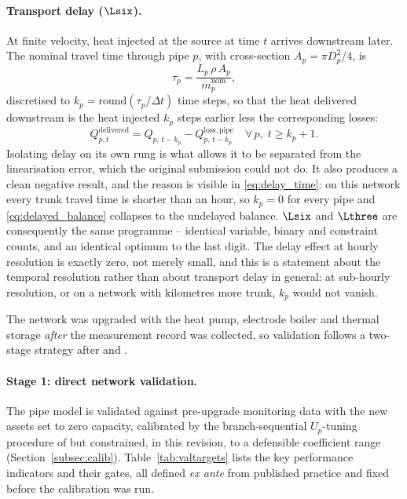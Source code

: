 \paragraph{Transport delay ($\Lsix$).}
At finite velocity, heat injected at the source at time $t$ arrives downstream later. The
nominal travel time through pipe $p$, with cross-section $A_p = \pi D_p^2/4$, is
%
\begin{equation}
  \tau_p = \frac{L_p\, \rho\, A_p}{\dot{m}_p^{\mathrm{nom}}},
  \label{eq:delay_time}
\end{equation}
%
discretised to $k_p = \mathrm{round}(\tau_p/\Delta t)$ time steps, so that the heat
delivered downstream is the heat injected $k_p$ steps earlier less the corresponding
losses:
%
\begin{equation}
  Q_{p,t}^{\mathrm{delivered}} =
    Q_{p,\,t-k_p} - Q_{p,\,t-k_p}^{\mathrm{loss,pipe}}
  \quad \forall\, p,\; t \geq k_p{+}1.
  \label{eq:delayed_balance}
\end{equation}
%
Isolating delay on its own rung is what allows it to be separated from the linearisation
error, which the original submission could not do. It also produces a clean negative
result, and the reason is visible in \eqref{eq:delay_time}: on this network every trunk
travel time is shorter than an hour, so $k_p = 0$ for every pipe and
\eqref{eq:delayed_balance} collapses to the undelayed balance. $\Lsix$ and $\Lthree$ are
consequently the same programme -- identical variable, binary and constraint counts, and
an identical optimum to the last digit. The delay effect at hourly resolution is exactly
zero, not merely small, and this is a statement about the temporal resolution rather than
about transport delay in general: at sub-hourly resolution, or on a network with
kilometres more trunk, $k_p$ would not vanish.


The network was upgraded with the heat pump, electrode boiler and thermal storage
\emph{after} the measurement record was collected, so validation follows a two-stage
strategy after \citet{Kus2025} and \citet{Maldonado2024}.

\paragraph{Stage 1: direct network validation.}
The pipe model is validated against pre-upgrade monitoring data with the new assets set to
zero capacity, calibrated by the branch-sequential $U_p$-tuning procedure of
\citet{Maldonado2024} but constrained, in this revision, to a defensible coefficient range
(Section~\ref{subsec:calib}). Table~\ref{tab:valtargets} lists the key performance
indicators and their gates, all defined \emph{ex ante} from published practice and fixed
before the calibration was run.

